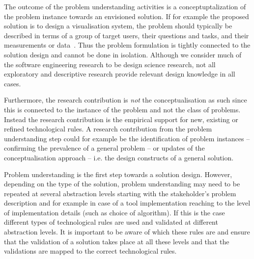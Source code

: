 \documentclass[graybox]{svmult}
\begin{document}

The outcome of the problem understanding activities is a conceptuptalization of the problem instance towards an envisioned solution. If for example the proposed solution is to design a visualisation system, the problem should typically be described in terms of a group of target users, their questions and tasks, and their measurements or data~\cite{meyer_nested_2015}. Thus the problem formulation is tightly connected to the solution design and cannot be done in isolation. Although we consider much of the software engineering research to be design science research, not all exploratory and descriptive research provide relevant design knowledge in all cases.


Furthermore, the research contribution is \emph{not} the conceptualisation as such since this is connected to the instance of the problem and not the class of problems. Instead the research contribution is the empirical support for new, existing or refined technological rules. A research contribution from the problem understanding step could for example be the identification of problem instances -- confirming the prevalence of a general problem -- or updates of the conceptualisation approach -- i.e. the design constructs of a general solution.


Problem understanding is the first step towards a solution design. However, depending on the type of the solution, problem understanding may need to be repeated at several abstraction levels starting with the stakeholder's problem description and for example in case of a tool implementation reaching to the level of implementation details (such as  choice of algorithm). If this is the case different types of technological rules are used and validated at different abstraction levels. It is important to be aware of which these rules are and ensure that the validation of a solution takes place at all these levels and that the validations are mapped to the correct technological rules. 
\end{document}
